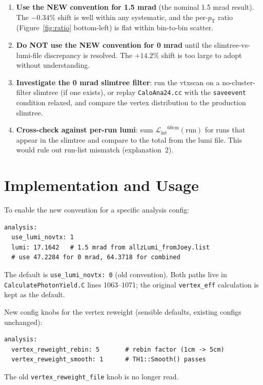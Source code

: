 \documentclass[11pt,letterpaper]{article}
\newcommand{\pT}{\ensuremath{p_{\text{T}}}}
\newcommand{\Lint}{\ensuremath{\mathcal{L}_{\text{int}}}}
\begin{document}
\begin{enumerate}
  \item \textbf{Use the NEW convention for 1.5 mrad} (the nominal
    1.5 mrad result). The $-0.34\%$ shift is well within any
    systematic, and the per-$\pT$ ratio (Figure~\ref{fig:ratio}
    bottom-left) is flat within bin-to-bin scatter.
  \item \textbf{Do NOT use the NEW convention for 0 mrad} until
    the slimtree-vs-lumi-file discrepancy is resolved. The $+14.2\%$
    shift is too large to adopt without understanding.
  \item \textbf{Investigate the 0 mrad slimtree filter}: run the
    vtxscan on a no-cluster-filter slimtree (if one exists), or
    replay \texttt{CaloAna24.cc} with the \texttt{saveevent}
    condition relaxed, and compare the vertex distribution to the
    production slimtree.
  \item \textbf{Cross-check against per-run lumi}: sum
    $\Lint^{60\text{cm}}(\text{run})$ for runs that appear in the
    slimtree and compare to the total from the lumi file. This
    would rule out run-list mismatch (explanation~2).
\end{enumerate}

\section{Implementation and Usage}
\label{sec:implementation}

To enable the new convention for a specific analysis config:

\begin{verbatim}
analysis:
  use_lumi_novtx: 1
  lumi: 17.1642   # 1.5 mrad from allzLumi_fromJoey.list
  # use 47.2284 for 0 mrad, 64.3718 for combined
\end{verbatim}

The default is \texttt{use\_lumi\_novtx: 0} (old convention). Both
paths live in \texttt{CalculatePhotonYield.C} lines 1063--1071; the
original \texttt{vertex\_eff} calculation is kept as the default.

New config knobs for the vertex reweight (sensible defaults, existing
configs unchanged):
\begin{verbatim}
analysis:
  vertex_reweight_rebin: 5       # rebin factor (1cm -> 5cm)
  vertex_reweight_smooth: 1      # TH1::Smooth() passes
\end{verbatim}

The old \texttt{vertex\_reweight\_file} knob is no longer read.
\end{document}
